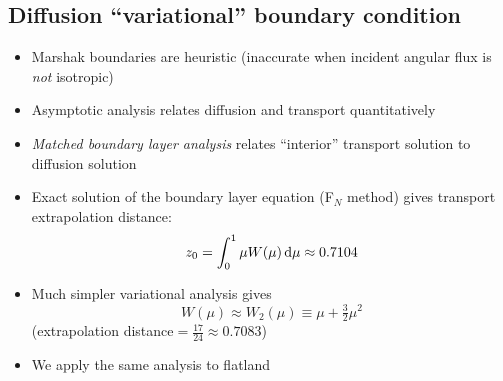 \documentclass[draft]{beamer}
\begin{document}
\subsection{Diffusion ``variational'' boundary condition}
\begin{frame}
  \begin{itemize}
    \item Marshak boundaries are heuristic (inaccurate when incident angular
      flux is \emph{not} isotropic)
    \item Asymptotic analysis relates diffusion and transport quantitatively
    \item \emph{Matched boundary layer analysis} relates ``interior'' transport
      solution to diffusion solution
    \item Exact solution of the boundary layer equation (F$_N$ method)
      gives transport extrapolation distance:
      \begin{equation*}
        z_0 = \int_{0}^{1} \mu W(\mu) \mathop{}\!\mathrm{d}\mu
        \approx 0.7104
      \end{equation*}
    \item Much simpler variational analysis \cite{Mal1991} gives
      \begin{equation*}
        W(\mu) \approx  W_2(\mu) \equiv \mu + \tfrac{3}{2} \mu^2  
      \end{equation*}
      (extrapolation distance${}= \tfrac{17}{24}
      \approx 0.7083$)
    \item We apply the same analysis to flatland
  \end{itemize}
\end{frame}
\end{document}
